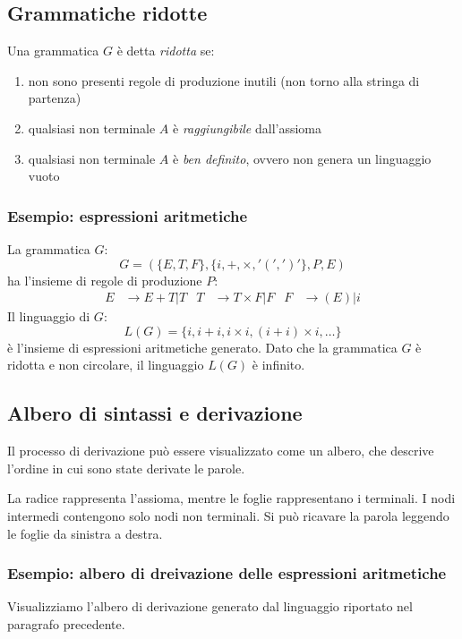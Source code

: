 \documentclass[11pt]{article}
\begin{document}
\subsection{Grammatiche ridotte}
Una grammatica $G$ è detta \textit{ridotta} se:
\begin{enumerate}
    \item non sono presenti regole di produzione inutili (non torno alla stringa di partenza)
    \item qualsiasi non terminale $A$ è \textit{raggiungibile} dall'assioma 
    \item qualsiasi non terminale $A$ è \textit{ben definito}, ovvero non genera un linguaggio vuoto
\end{enumerate}
\subsubsection*{Esempio: espressioni aritmetiche}
La grammatica $G$:
\begin{equation*}
    G=(\{E,T,F\},\{i,+,\times,'(',')'\},P,E)
\end{equation*}
ha l'insieme di regole di produzione $P$:
\begin{align*}
    E&\rightarrow E+T|T & T&\rightarrow T\times F|F & F&\rightarrow (E)|i
\end{align*}
Il linguaggio di $G$:
\begin{equation*}
    L(G)=\{i,i+i,i\times i,(i+i)\times i,\dots\}
\end{equation*}
è l'insieme di espressioni aritmetiche generato. Dato che la grammatica $G$ è ridotta e non circolare, il linguaggio 
$L(G)$ è infinito.
\subsection{Albero di sintassi e derivazione}
Il processo di derivazione può essere visualizzato come un albero, che descrive l'ordine in cui sono state derivate 
le parole. 

La radice rappresenta l'assioma, mentre le foglie rappresentano i terminali. I nodi intermedi contengono solo nodi non 
terminali. Si può ricavare la parola leggendo le foglie da sinistra a destra.
\subsubsection{Esempio: albero di dreivazione delle espressioni aritmetiche}
Visualizziamo l'albero di derivazione generato dal linguaggio riportato nel paragrafo precedente.
\end{document}
